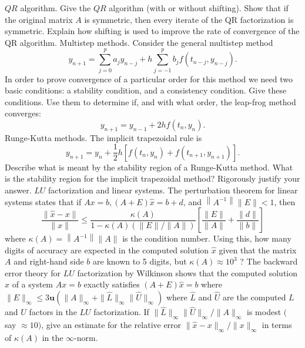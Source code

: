 \documentclass[14pt]{extarticle}
\begin{document}
$Q R$ algorithm. Give the $Q R$ algorithm (with or without shifting). Show that if the original matrix $A$ is symmetric, then every iterate of the QR factorization is symmetric. Explain how shifting is used to improve the rate of convergence of the QR algorithm.
\newpage
Multistep methods. Consider the general multistep method
$$
y_{n+1}=\sum_{j=0}^{p} a_{j} y_{n-j}+h \sum_{j=-1}^{p} b_{j} f\left(t_{n-j}, y_{n-j}\right) .
$$
In order to prove convergence of a particular order for this method we need two basic conditions: a stability condition, and a consistency condition. Give these conditions. Use them to determine if, and with what order, the leap-frog method converges:
$$
y_{n+1}=y_{n-1}+2 h f\left(t_{n}, y_{n}\right) .
$$
\newpage
Runge-Kutta methods. The implicit trapezoidal rule is
$$
y_{n+1}=y_{n}+\frac{1}{2} h\left[f\left(t_{n}, y_{n}\right)+f\left(t_{n+1}, y_{n+1}\right)\right] .
$$
Describe what is meant by the stability region of a Runge-Kutta method. What is the stability region for the implicit trapezoidal method? Rigorously justify your answer.
\newpage
$L U$ factorization and linear systems. The perturbation theorem for linear systems states that if $A x=b,(A+E) \widehat{x}=b+d$, and $\left\|A^{-1}\right\|\|E\|<1$, then
$$
\frac{\|\widehat{x}-x\|}{\|x\|} \leq \frac{\kappa(A)}{1-\kappa(A)(\|E\| /\|A\|)}\left[\frac{\|E\|}{\|A\|}+\frac{\|d\|}{\|b\|}\right]
$$
where $\kappa(A)=\left\|A^{-1}\right\|\|A\|$ is the condition number. Using this, how many digits of accuracy are expected in the computed solution $\hat{x}$ given that the matrix $A$ and right-hand side $b$ are known to 5 digits, but $\kappa(A) \approx 10^{3}$ ? The backward error theory for $L U$ factorization by Wilkinson shows that the computed solution $\hat{x}$ of a system $A x=b$ exactly satisfies $(A+E) \widehat{x}=b$ where $\|E\|_{\infty} \leq 3 \mathbf{u}\left(\|A\|_{\infty}+\|\widehat{L}\|_{\infty}\|\widehat{U}\|_{\infty}\right)$ where $\widehat{L}$ and $\widehat{U}$ are the computed $L$ and $U$ factors in the $L U$ factorization. If $\|\widehat{L}\|_{\infty}\|\widehat{U}\|_{\infty} /\|A\|_{\infty}$ is modest $($ say $\approx 10)$, give an estimate for the relative error $\|\widehat{x}-x\|_{\infty} /\|x\|_{\infty}$ in terms of $\kappa(A)$ in the $\infty$-norm.
\end{document}
